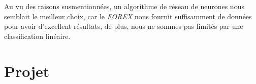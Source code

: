 \documentclass[a4paper, 11pt]{article}
\begin{document}
Au vu des raisons susmentionnées, un algorithme de réseau de neurones nous semblait le meilleur choix, car le \textit{FOREX} nous
fournit suffisamment de données pour avoir d'excellent résultats, de plus, nous ne sommes pas limités par une classification linéaire.


\newpage
\section{Projet}
\newpage



\nocite{*}

\end{document}
